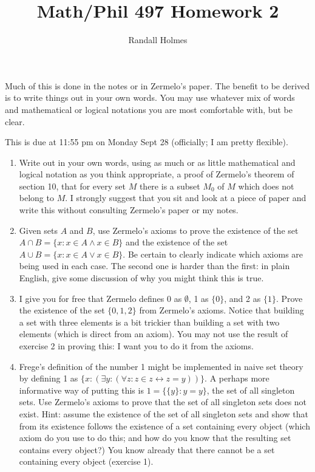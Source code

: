 \documentclass[12pt]{article}
\title{Math/Phil 497 Homework 2}
\author{Randall Holmes}
\begin{document}
\maketitle

Much of this is done in the notes or in Zermelo's paper.  The benefit to be derived is to write things out in your own words.  You may use whatever mix of words and mathematical or logical notations you are most comfortable with, but be clear.

This is due at 11:55 pm on Monday Sept 28 (officially;  I am pretty flexible). 

\begin{enumerate}

\item  Write out in your own words, using as much or as little mathematical and logical notation as you think appropriate, a proof of Zermelo's theorem of section 10,
that for every set $M$ there is a subset $M_0$ of $M$ which does not belong to $M$.  I strongly suggest that you sit and look at a piece of paper and write this without consulting Zermelo's paper or my notes.

\item  Given sets $A$ and $B$, use Zermelo's axioms to prove the existence of the set $A \cap B = \{x:x \in A \wedge x \in B\}$ and the existence of the set $A \cup B = \{x:x \in A \vee x \in B\}$.  Be certain to clearly indicate which axioms are being used in each case.  The second one is harder than the first:  in plain English, give some discussion of why you might think this is true.

\item I give you for free that Zermelo defines 0 as $\emptyset$, 1 as $\{0\}$, and 2 as $\{1\}$.  Prove the existence of the set $\{0,1,2\}$ from Zermelo's axioms.  Notice that building a set with three elements is a bit trickier than building a set with two elements (which is direct from an axiom).  You  may not use the result of exercise 2 in proving this:  I want you to do it from the axioms.

\item  Frege's definition of the number 1 might be implemented in naive set theory by defining 1 as $\{x:(\exists y:(\forall z:z\in z \leftrightarrow z = y))\}$.  A perhaps more informative way of putting this is $1 = \{\{y\}: y=y\}$, the set of all singleton sets.  Use Zermelo's axioms to prove that the set of all singleton sets does not exist.  Hint:  assume the existence of the set of all singleton sets and show that from its existence follows the existence of a set containing every object (which axiom do you use to do this;  and how do you know that the resulting set contains every object?)  You know already that there cannot be a set containing every object (exercise 1).


\end{enumerate}
\end{document}
